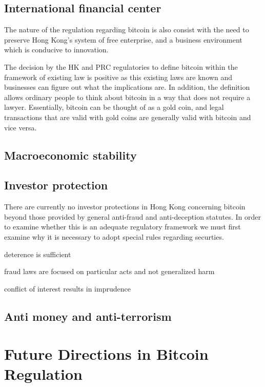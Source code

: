 \subsection{International financial center}

The nature of the regulation regarding bitcoin is also consist with
the need to preserve Hong Kong's system of free enterprise, and a
business environment which is conducive to innovation.

The decision by the HK and PRC regulatories to define bitcoin within
the framework of existing law is positive as this existing laws are
known and businesses can figure out what the implications are.  In
addition, the definition allows ordinary people to think about bitcoin
in a way that does not require a lawyer.  Essentially, bitcoin can be
thought of as a gold coin, and legal transactions that are valid with
gold coins are generally valid with bitcoin and vice versa.

\subsection{Macroeconomic stability}

\subsection{Investor protection}
There are currently no investor protections in Hong Kong concerning
bitcoin beyond those provided by general anti-fraud and anti-deception
statutes.  In order to examine whether this is an adequate regulatory
framework we must first examine why it is necessary to adopt special
rules regarding securties.

deterence is sufficient

fraud laws are focused on particular acts and not generalized harm

conflict of interest results in imprudence





\subsection{Anti money and anti-terrorism}

\section{Future Directions in Bitcoin Regulation}

